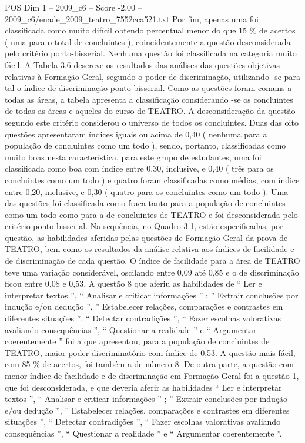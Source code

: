 \begin{textsample}{POS Dim 1 – 2009\_c6 – Score -2.00 – 2009\_c6/enade\_2009\_teatro\_7552cca521.txt}
Por fim, apenas uma foi classificada como muito difícil obtendo percentual menor do que 15 \% de acertos ( uma para o total de concluintes ), coincidentemente a questão desconsiderada pelo critério ponto-bisserial.
Nenhuma questão foi classificada na categoria muito fácil.
A Tabela 3.6 descreve os resultados das análises das questões objetivas relativas à Formação Geral, segundo o poder de discriminação, utilizando -se para tal o índice de discriminação ponto-bisserial.
Como as questões foram comuns a todas as áreas, a tabela apresenta a classificação considerando -se os concluintes de todas as áreas e aqueles do curso de TEATRO.
A desconsideração da questão segundo este critério considerou o universo de todos os concluintes.
Duas das oito questões apresentaram índices iguais ou acima de 0,40 ( nenhuma para a população de concluintes como um todo ), sendo, portanto, classificadas como muito boas nesta característica, para este grupo de estudantes, uma foi classificada como boa com índice entre 0,30, inclusive, e 0,40 ( três para os concluintes como um todo ) e quatro foram classificadas como médias, com índice entre 0,20, inclusive, e 0,30 ( quatro para os concluintes como um todo ).
Uma das questões foi classificada como fraca tanto para a população de concluintes como um todo como para a de concluintes de TEATRO e foi desconsiderada pelo critério ponto-bisserial.
Na sequência, no Quadro 3.1, estão especificadas, por questão, as habilidades aferidas pelas questões de Formação Geral da prova de TEATRO, bem como os resultados da análise relativa aos índices de facilidade e de discriminação de cada questão.
O índice de facilidade para a área de TEATRO teve uma variação considerável, oscilando entre 0,09 até 0,85 e o de discriminação ficou entre 0,08 e 0,53.
A questão 8 que aferiu as habilidades de “ Ler e interpretar textos ”, “ Analisar e criticar informações ” ; ” Extrair conclusões por indução e/ou dedução ”, ” Estabelecer relações, comparações e contrastes em diferentes situações ”, “ Detectar contradições ”, “ Fazer escolhas valorativas avaliando consequências ”, “ Questionar a realidade ” e “ Argumentar coerentemente ” foi a que apresentou, para a população de concluintes de TEATRO, maior poder discriminatório com índice de 0,53.
A questão mais fácil, com 85 \% de acertos, foi também a de número 8.
De outra parte, a questão com menor índice de facilidade e de discriminação em Formação Geral foi a questão 1, que foi desconsiderada, e que deveria aferir as habilidades “ Ler e interpretar textos ”, “ Analisar e criticar informações ” ; ” Extrair conclusões por indução e/ou dedução ”, ” Estabelecer relações, comparações e contrastes em diferentes situações ”, “ Detectar contradições ”, “ Fazer escolhas valorativas avaliando consequências ”, “ Questionar a realidade ” e “ Argumentar coerentemente ”.

\end{textsample}
